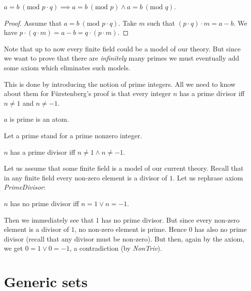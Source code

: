 \documentclass{article}
\renewcommand{\mod}{\text{mod }}
\begin{document}
\begin{forthel}
    \begin{lemma}[EquModMul]
      $a = b ~(\mod p \cdot q) \implies a = b ~(\mod p) \wedge a = b ~(\mod q)$.
    \end{lemma}
    \begin{proof}
      Assume that $a = b ~(\mod p \cdot q)$. Take $m$ such that $(p \cdot q) \cdot m = a - b$. We have $p \cdot (q \cdot m) = a - b = q \cdot (p \cdot m)$.
    \end{proof}
  \end{forthel}

  Note that up to now every finite field could be a model of our theory. But since we want to prove that there are \textit{infinitely} many primes we must eventually add some axiom which eliminates such models.

  This is done by introducing the notion of prime integers. All we need to know about them for Fürstenberg's proof is that every integer $n$ has a prime divisor iff $n \neq 1$ and $n \neq -1$.

  \begin{forthel}
    \begin{signature}[Prime]
      $a$ is prime is an atom.
    \end{signature}

    Let a prime stand for a prime nonzero integer.

    \begin{axiom}[PrimeDivisor]
      $n$ has a prime divisor iff $n \neq 1 \wedge n \neq -1$.
    \end{axiom}
  \end{forthel}

  Let us assume that some finite field is a model of our current theory. Recall that in any finite field every non-zero element is a divisor of $1$. Let us rephrase axiom \textit{PrimeDivisor}:

  \begin{center}
    $n$ has no prime divisor iff $n = 1 \vee n = -1$.
  \end{center}

  Then we immediately see that $1$ has no prime divisor. But since every non-zero element is a divisor of $1$, no non-zero element is prime. Hence $0$ has also no prime divisor (recall that any divisor must be non-zero). But then, again by the axiom, we get $0 = 1 \vee 0 = -1$, a contradiction (by \textit{NonTriv}).

  \section{Generic sets}
\end{document}
